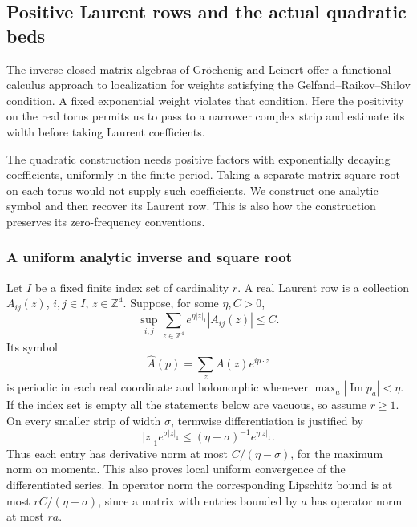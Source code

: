 \subsection{Positive Laurent rows and the actual quadratic beds}
\label{sec:positive-row-producer}

The inverse-closed matrix algebras of Gr\"ochenig and Leinert
\cite[Theorem~6 and Remark~1 following Corollary~7]{GrochenigLeinert}
offer a functional-calculus approach to localization for weights
satisfying the Gelfand--Raikov--Shilov condition. A fixed exponential
weight violates that condition. Here the positivity on the real
torus permits us to pass to a narrower complex strip and estimate
its width before taking Laurent coefficients.

The quadratic construction needs positive factors with exponentially
decaying coefficients, uniformly in the finite period. Taking a separate
matrix square root on each torus would not supply such coefficients.
We construct one analytic symbol and then recover its Laurent row.
This is also how the construction preserves its zero-frequency
conventions.

\subsubsection{A uniform analytic inverse and square root}
Let $I$ be a fixed finite index set of cardinality $r$. A real Laurent
row is a collection $A_{ij}(z)$, $i,j\in I$, $z\in\mathbb Z^4$.
Suppose, for some $\eta,C>0$,
\begin{equation}\label{eq:positive-row-strip}
 \sup_{i,j}\sum_{z\in\mathbb Z^4}
                    e^{\eta|z|_1}|A_{ij}(z)|\le C.
\end{equation}
Its symbol
\[
                  \widehat A(p)=\sum_z A(z)e^{ip\cdot z}
\]
is periodic in each real coordinate and holomorphic whenever
$\max_a|\operatorname{Im}p_a|<\eta$. If the index set is empty
all the statements below are vacuous, so assume $r\ge1$.
On every smaller strip of width $\sigma$, termwise differentiation
is justified by
\[
 |z|_1 e^{\sigma|z|_1}
             \le(\eta-\sigma)^{-1}e^{\eta|z|_1}.
\]
Thus each entry has derivative norm at most
$C/(\eta-\sigma)$, for the maximum norm on momenta. This
also proves local uniform convergence of the differentiated series.
In operator norm the corresponding Lipschitz bound is at most
$rC/(\eta-\sigma)$, since a matrix with entries bounded by $a$
has operator norm at most $ra$.

